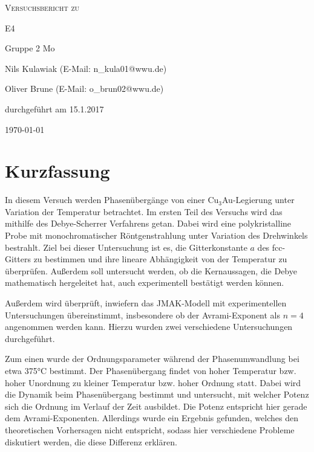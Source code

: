 \documentclass[
	a4paper,
	12pt,
	pagesize,
	ngerman
]{scrartcl}
\begin{document}
\begin{titlepage}
	\centering
	{\scshape\LARGE Versuchsbericht zu \par}
	\vspace{1cm}
	{\scshape\huge E4\par}
	\vspace{2.5cm}
	{\LARGE Gruppe 2 Mo\par}
	\vspace{0.5cm}
	{\large Nils Kulawiak (E-Mail: n\_kula01@wwu.de) \par}
	{\large Oliver Brune (E-Mail: o\_brun02@wwu.de) \par}
	\vfill
	durchgeführt am 15.1.2017\par
	
	\vfill

	{\large \today\par}
\end{titlepage}


\tableofcontents
	
	
\newpage
\section{Kurzfassung}
In diesem Versuch werden Phasenübergänge von einer Cu$_{3}$Au-Legierung unter Variation der Temperatur betrachtet. Im ersten Teil des Versuchs wird das mithilfe des Debye-Scherrer Verfahrens getan. Dabei wird eine polykristalline Probe mit monochromatischer Röntgenstrahlung unter Variation des Drehwinkels bestrahlt. Ziel bei dieser Untersuchung ist es, die Gitterkonstante $a$ des fcc-Gitters zu bestimmen und ihre lineare Abhängigkeit von der Temperatur zu überprüfen. Außerdem soll untersucht werden, ob die Kernaussagen, die Debye mathematisch hergeleitet hat, auch experimentell bestätigt werden können.

Außerdem wird überprüft, inwiefern das JMAK-Modell mit experimentellen Untersuchungen übereinstimmt, insbesondere ob der Avrami-Exponent als $n=4$ angenommen werden kann. Hierzu wurden zwei verschiedene Untersuchungen durchgeführt.

Zum einen wurde der Ordnungsparameter während der Phasenumwandlung bei etwa 375°C bestimmt. Der Phasenübergang findet von hoher Temperatur bzw. hoher Unordnung zu kleiner Temperatur bzw. hoher Ordnung statt. Dabei wird die Dynamik beim Phasenübergang bestimmt und untersucht, mit welcher Potenz sich die Ordnung im Verlauf der Zeit ausbildet. Die Potenz entspricht hier gerade dem Avrami-Exponenten. Allerdings wurde ein Ergebnis gefunden, welches den theoretischen Vorhersagen nicht entspricht, sodass hier verschiedene Probleme diskutiert werden, die diese Differenz erklären.
\end{document}
